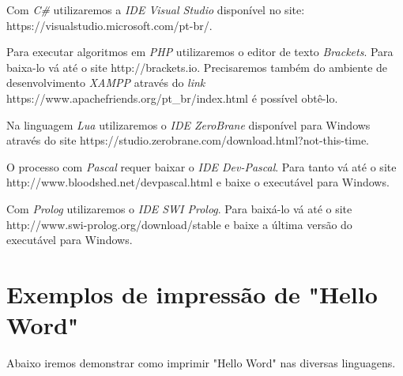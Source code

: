 \documentclass[conference]{IEEEtran}
\begin{document}
Com \textit{C\#} utilizaremos a \textit{IDE Visual Studio} disponível no site: https://visualstudio.microsoft.com/pt-br/.

Para executar algoritmos em \textit{PHP} utilizaremos o editor de texto \textit{Brackets}. Para baixa-lo vá até o site http://brackets.io. Precisaremos também do ambiente de desenvolvimento \textit{XAMPP} através do \textit{link} https://www.apachefriends.org/pt\_br/index.html é possível obtê-lo.

Na linguagem \textit{Lua} utilizaremos o \textit{IDE ZeroBrane} disponível para Windows através do site https://studio.zerobrane.com/download.html?not-this-time.

O processo com \textit{Pascal} requer baixar o \textit{IDE Dev-Pascal}. Para tanto vá até o site http://www.bloodshed.net/devpascal.html e baixe o executável para Windows.

Com \textit{Prolog} utilizaremos o \textit{IDE SWI Prolog}. Para baixá-lo vá até o site http://www.swi-prolog.org/download/stable e baixe a última versão do executável para Windows.

\section{Exemplos de impressão de "Hello Word"}

Abaixo iremos demonstrar como imprimir "Hello Word" nas diversas linguagens.
\end{document}

